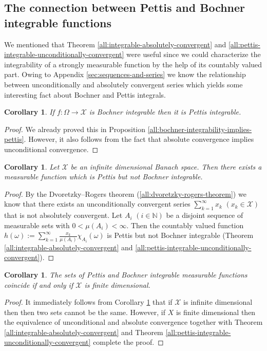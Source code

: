 \documentclass[a4paper, 12pt]{article}
\newtheorem{corollary}[lem]{Corollary}
\begin{document}
\subsection{The connection between Pettis and Bochner integrable functions}
We mentioned that Theorem \ref{all:integrable-absolutely-convergent} and \ref{all:pettis-integrable-unconditionally-convergent} were useful since we could characterize the integrability of a strongly measurable function by the help of its countably valued part. Owing to Appendix \ref{sec:sequences-and-series} we know the relationship between unconditionally and absolutely convergent series which yields some interesting fact about Bochner and Pettis integrals.
\begin{corollary} If $f\colon \Omega \to \mathcal{X}$ is Bochner integrable then it is Pettis integrable.
\end{corollary}
\begin{proof} We already proved this in Proposition \ref{all:bochner-integrability-implies-pettis}. However, it also follows from the fact that absolute convergence implies unconditional convergence.
\end{proof}
\begin{corollary}\label{cor:pettis-but-not-bochner-integrable} Let $\mathcal{X}$ be an infinite dimensional Banach space. Then there exists a measurable function which is Pettis but not Bochner integrable.
\end{corollary} 
\begin{proof} By the Dvoretzky\---Rogers theorem (\ref{all:dvoretzky-rogers-theorem}) we know that there exists an unconditionally convergent series $\sum^{\infty}_{k=1} x_k$ $(x_k \in \mathcal{X})$ that is not absolutely convergent. Let $A_i$ $(i \in \mathbb{N})$ be a disjoint sequence of measurable sets with $0 < \mu(A_i) < \infty$. Then the countably valued function $h(\omega) := \sum^{\infty}_{k=1} \frac{x_k}{\mu(A_i)} \chi_{A_i}(\omega)$ is Pettis but not Bochner integrable (Theorem \ref{all:integrable-absolutely-convergent} and \ref{all:pettis-integrable-unconditionally-convergent}).
\end{proof}
\begin{corollary}  The sets of Pettis and Bochner integrable measurable functions coincide if and only if $\mathcal{X}$ is finite dimensional. 
\end{corollary}
\begin{proof} It immediately follows from Corollary \ref{cor:pettis-but-not-bochner-integrable} that if $\mathcal{X}$ is infinite dimensional then then two sets cannot be the same. However, if $X$ is finite dimensional then the equivalence of unconditional and absolute convergence together with Theorem \ref{all:integrable-absolutely-convergent} and Theorem \ref{all:pettis-integrable-unconditionally-convergent} complete the proof.
\end{proof}
\end{document}
